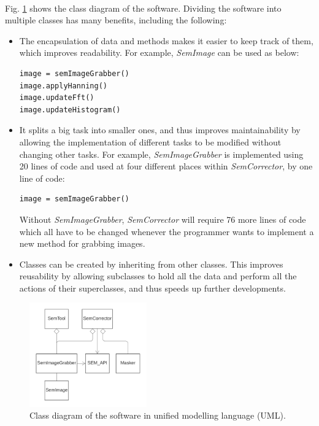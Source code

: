 \documentclass[12pt, twocolumn]{report}
\begin{document}
\paragraph{}
Fig. \ref{Software class diagram} shows the class diagram of the software. Dividing the software into multiple classes has many benefits, including the following:
\begin{itemize}
    \item The encapsulation of data and methods makes it easier to keep track of them, which improves readability. For example, \textit{SemImage} can be used as below:
    \begin{lstlisting}
image = semImageGrabber()
image.applyHanning()
image.updateFft()
image.updateHistogram()
    \end{lstlisting}
    \item It splits a big task into smaller ones, and thus improves maintainability by allowing the implementation of different tasks to be modified without changing other tasks. For example, \textit{SemImageGrabber} is implemented using 20 lines of code and used at four different places within \textit{SemCorrector}, by one line of code:
    \begin{lstlisting}
image = semImageGrabber()
    \end{lstlisting}
    Without \textit{SemImageGrabber}, \textit{SemCorrector} will require 76 more lines of code which all have to be changed whenever the programmer wants to implement a new method for grabbing images.
    \item Classes can be created by inheriting from other classes. This improves reusability by allowing subclasses to hold all the data and perform all the actions of their superclasses, and thus speeds up further developments.
\end{itemize}

\begin{figure}[htbp]
    \centering
    \includegraphics[width=0.45\textwidth]{Figures/Software class diagram.png}
    \caption{Class diagram of the software in unified modelling language (UML).}
    \label{Software class diagram}
\end{figure}
\end{document}
